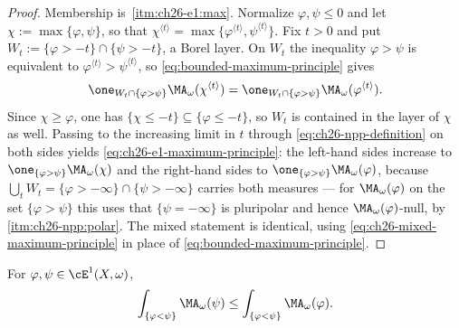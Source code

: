 \begin{proof}
Membership is \,\cref{itm:ch26-e1:max}.
Normalize \(\varphi,\psi\leq0\) and let \(\chi:=\max\{\varphi,\psi\}\), so
that \(\chi^{\langle t\rangle}=\max\{\varphi^{\langle
t\rangle},\psi^{\langle t\rangle}\}\).  Fix \(t>0\) and put
\(W_t:=\{\varphi>-t\}\cap\{\psi>-t\}\), a Borel layer.  On \(W_t\) the
inequality \(\varphi>\psi\) is equivalent to
\(\varphi^{\langle t\rangle}>\psi^{\langle t\rangle}\), so
\eqref{eq:bounded-maximum-principle} gives
\[
 \one_{W_t\cap\{\varphi>\psi\}}\MA_\omega(\chi^{\langle t\rangle})
 =\one_{W_t\cap\{\varphi>\psi\}}\MA_\omega(\varphi^{\langle t\rangle}).
\]
Since \(\chi\geq\varphi\), one has \(\{\chi\leq-t\}\subseteq\{\varphi\leq
-t\}\), so \(W_t\) is contained in the layer of \(\chi\) as well.  Passing to
the increasing limit in \(t\) through \eqref{eq:ch26-npp-definition} on both
sides yields \eqref{eq:ch26-e1-maximum-principle}: the left-hand sides
increase to \(\one_{\{\varphi>\psi\}}\MA_\omega(\chi)\) and the right-hand
sides to \(\one_{\{\varphi>\psi\}}\MA_\omega(\varphi)\), because
\(\bigcup_tW_t=\{\varphi>-\infty\}\cap\{\psi>-\infty\}\) carries both
measures --- for \(\MA_\omega(\varphi)\) on the set \(\{\varphi>\psi\}\) this
uses that \(\{\psi=-\infty\}\) is pluripolar and hence
\(\MA_\omega(\varphi)\)-null, by
\,\cref{itm:ch26-npp:polar}.  The mixed statement is
identical, using \eqref{eq:ch26-mixed-maximum-principle} in place of
\eqref{eq:bounded-maximum-principle}.
\end{proof}

\begin{corollary}
\label{cor:ch26-e1-comparison}
For \(\varphi,\psi\in\cE^1(X,\omega)\),
\begin{equation}
\label{eq:ch26-e1-comparison}
 \int_{\{\varphi<\psi\}}\MA_\omega(\psi)
 \leq\int_{\{\varphi<\psi\}}\MA_\omega(\varphi).
\end{equation}
\end{corollary}

